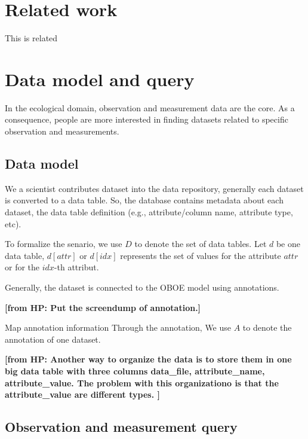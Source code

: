 \documentclass[conference]{IEEEtran}
\newcommand{\from}[2]{{\bf[{\sc from #1:} #2]}}
\begin{document}
\section{Related work}

This is related

\section{Data model and query}

In the ecological domain, observation and measurement data are the
core. As a consequence, people are more interested in finding datasets
related to specific observation and measurements. 

\subsection{Data model}

We a scientist contributes dataset into the data repository, generally
each dataset is converted to a data table. 
So, the database contains metadata about each dataset, the data table
definition (e.g., attribute/column name, attribute type, etc). 

To formalize the senario, we use $D$ to denote the set of data tables. Let $d$ be one data table, 
$d[attr]$ or $d[idx]$ represents the set of values for the attribute
$attr$ or for the $idx$-th attribut. 

Generally, the dataset is connected to the OBOE model using
annotations. 

\from{HP}{Put the screendump of annotation.}

Map annotation information 
Through the annotation, 
We use $A$ to denote the annotation of one dataset. 




\from{HP}{Another way to organize the data is to store them in one big
data table with three columns data\_file, attribute\_name,
attribute\_value. The problem with this organizationo is that the
attribute\_value are different types. } 





\subsection{Observation and measurement query}
\end{document}
